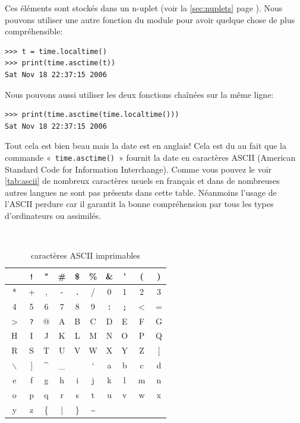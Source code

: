Ces éléments sont stockés dans un n-uplet (voir la \autoref{sec:nuplets} page \pageref{sec:nuplets}). Nous pouvons utiliser une autre fonction du module pour avoir quelque chose de plus compréhensible:

\begin{Verbatim}[frame=single,rulecolor=\color{mbleu}, label=à taper]
>>> t = time.localtime()
>>> print(time.asctime(t))
Sat Nov 18 22:37:15 2006
\end{Verbatim}

Nous pouvons aussi utiliser les deux fonctions chaînées sur la même ligne:

\begin{Verbatim}[frame=single,rulecolor=\color{mbleu}, label=à taper]
>>> print(time.asctime(time.localtime()))
Sat Nov 18 22:37:15 2006
\end{Verbatim}

Tout cela est bien beau mais la date est en anglais! Cela est du au fait que la commande «~\texttt{time.asctime()}~» fournit la date en caractères ASCII (American Standard Code for Information Interchange). Comme vous pouvez le voir \autoref{tab:ascii} de nombreux caractères usuels en français et dans de nombreuses autres langues ne sont pas présents dans cette table. Néanmoins l'usage de l'ASCII perdure car il garantit la bonne compréhension par tous les types d'ordinateurs ou assimilés.

\begin{table}[h!]
\tt
\centering
\begin{tabular}{|c|c|c|c|c|c|c|c|c|c|}
\hline 
\verb*+ + & \verb+!+ & " & \# & \$ & \% & \& & ' & ( & ) \\ 
\hline
* & + & , & - & \verb+.+ & / & 0 & 1 & 2 & 3 \\ 
\hline
4 & 5 & 6 & 7 & 8 & 9 & \verb+:+ & \verb+;+ & $<$ & = \\ 
\hline
$>$ & \verb+?+ & @ & A & B & C & D & E & F & G \\ 
\hline
H & I & J & K & L & M & N & O & P & Q \\ 
\hline
R & S & T & U & V & W & X & Y & Z & [ \\ 
\hline
$\backslash$ & ] & \textasciicircum & \_ &  & ` & a & b & c & d \\ 
\hline
e & f & g & h & i & j & k & l & m & n \\ 
\hline
o & p & q & r & s & t & u & v & w & x \\ 
\hline
y & z & \{ & | & \} & \textasciitilde &  &  &  &  \\ 
\hline
\end{tabular}
\rm
\caption{caractères ASCII imprimables} \label{tab:ascii}
\end{table}

